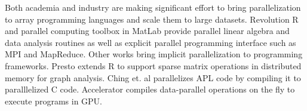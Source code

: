 Both academia and industry are making significant effort to bring parallelization to
array programming languages and scale them to large datasets. Revolution R
\cite{rre} and parallel computing toolbox in MatLab \cite{matlab} provide
parallel linear algebra and data analysis routines as well as explicit
parallel programming interface such as MPI and MapReduce. Other works bring
implicit parallelization to programming frameworks. Presto \cite{presto}
extends R to support sparse matrix operations in distributed memory for graph
analysis. Ching et. al \cite{Ching12} parallelizes APL code by
compiling it to paralllelized C code. Accelerator \cite{accelerator} compiles
data-parallel operations on the fly to execute programs in GPU.
